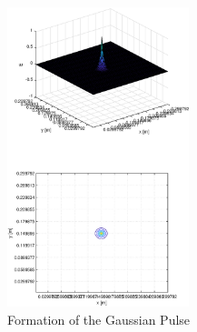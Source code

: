 \documentclass{article}
\begin{document}
\begin{figure}
  \centering
  \includegraphics[width=200]{GaussianPulse}
  \caption{Formation of the Gaussian Pulse}\label{fig:GaussianPulse}
\end{figure}
\end{document}
